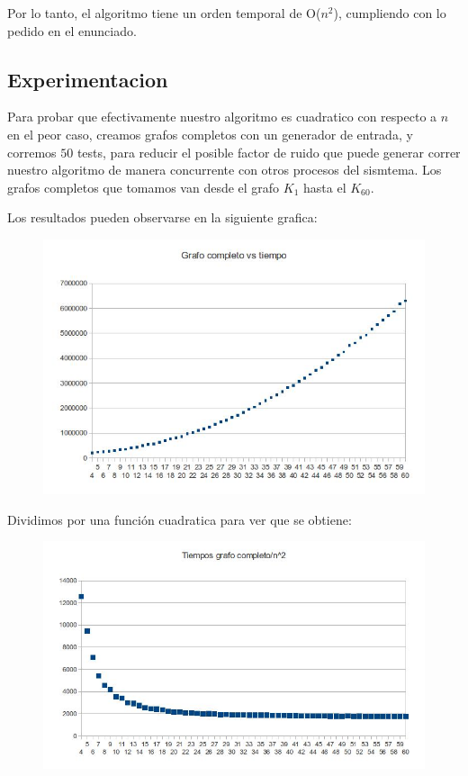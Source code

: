 Por lo tanto, el algoritmo tiene un orden temporal de O($n^2$), cumpliendo con lo pedido en el enunciado.

\subsection{Experimentacion}

Para probar que efectivamente nuestro algoritmo es cuadratico con respecto a $n$ en el peor caso, creamos grafos completos con un generador de entrada, y corremos $50$ tests, para reducir el posible factor de ruido que puede generar correr nuestro algoritmo de manera concurrente con otros procesos del sismtema.
Los grafos completos que tomamos van desde el grafo $K_1$ hasta el $K_60$.

Los resultados pueden observarse en la siguiente grafica:

\begin{figure}[h!]
  \begin{center}
	\includegraphics[scale=0.5]{Ej3/resultados1.jpg}
	\label{nombreparareferenciar}
  \end{center}
\end{figure}

\newpage
Dividimos por una función cuadratica para ver que se obtiene:

\begin{figure}[h!]
  \begin{center}
	\includegraphics[scale=0.5]{Ej3/resultados2.jpg}
	\label{nombreparareferenciar}
  \end{center}
\end{figure}

